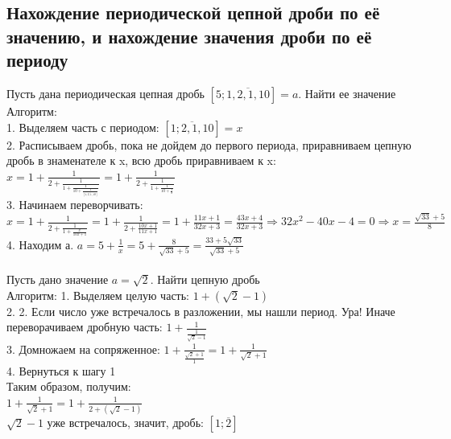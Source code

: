\subsection*{Нахождение периодической цепной дроби по её значению, и нахождение значения дроби по её периоду}
Пусть дана периодическая цепная дробь $[5; \overline{1, 2, 1 ,10}] = a$. Найти ее значение\\
Алгоритм: \\
1. Выделяем часть с периодом: $[\overline{1; 2, 1 ,10}] = x$ \\
2. Расписываем дробь, пока не дойдем до первого периода, приравниваем цепную дробь в знаменателе к x, всю дробь приравниваем к x:
$x = 1 +\frac{1}{2 + \frac{1}{1 + \frac{1}{10 + \frac{1}{\overline{[1; 2, 1 ,10]}}}}} = 1 +\frac{1}{2 + \frac{1}{1 + \frac{1}{10 + \frac{1}{x}}}}$\\
3. Начинаем переворчивать: $x = 1 +\frac{1}{2 + \frac{1}{1 + \frac{x}{10x + 1}}} = 1 +\frac{1}{2 + \frac{10x + 1}{11x + 1}} =  1 +\frac{11x + 1}{32x + 3} = \frac{43x + 4}{32x + 3} \Longrightarrow 32x^2 - 40x - 4 = 0 \Longrightarrow x = \frac{\sqrt{33} + 5}{8} $\\
4. Находим а. $a = 5 + \frac{1}{x} = 5 + \frac{8}{\sqrt{33} + 5} = \frac{33 + 5\sqrt{33}}{\sqrt{33} + 5} $
\\
\\
Пусть дано значение $a = \sqrt{2}$. Найти цепную дробь\\
Алгоритм:
1. Выделяем целую часть: $1 + (\sqrt{2} - 1)$ \\
2. 2. Если число уже встречалось в разложении, мы нашли период. Ура! Иначе переворачиваем дробную часть: $1 + \frac{1}{ \frac{1}{\sqrt{2} - 1}}$\\
3. Домножаем на сопряженное:  $1 + \frac{1}{ \frac{\sqrt{2} + 1}{1}} = 1 + \frac{1}{\sqrt{2} + 1} $\\
4. Вернуться к шагу 1\\
Таким образом, получим:\\
$1 + \frac{1}{\sqrt{2} + 1} = 1 + \frac{1}{ 2 + (\sqrt{2} -1)}$\\
$\sqrt{2} -1$ уже встречалось, значит, дробь: $[1;\overline{2}]$